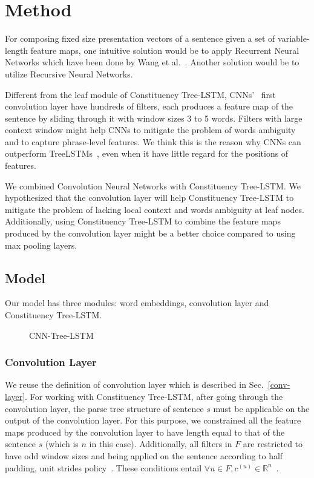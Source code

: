 \section{Method}\label{sec:cnn-treelstm}
For composing fixed size presentation vectors of a sentence given a set of variable-length feature maps, one intuitive solution would be to apply Recurrent Neural Networks which have been done by Wang et al.~\cite{cnn-rnn}.
Another solution would be to utilize Recursive Neural Networks.

Different from the leaf module of Constituency Tree-LSTM, CNNs'~\cite{KimCNN,DCNN,2-layer-cnn} first convolution layer have hundreds of filters, each produces a feature map of the sentence by sliding through it with window sizes 3 to 5 words.
Filters with large context window might help CNNs to mitigate the problem of words ambiguity and to capture phrase-level features.
We think this is the reason why CNNs can outperform TreeLSTMs~\cite{KimCNN}, even when it have little regard for the positions of features. 

We combined Convolution Neural Networks with Constituency Tree-LSTM.
We hypothesized that the convolution layer will help Constituency Tree-LSTM to mitigate the problem of lacking local context and words ambiguity at leaf nodes.
Additionally, using Constituency Tree-LSTM to combine the feature maps produced by the convolution layer might be a better choice compared to using max pooling layers.
\subsection{Model}
Our model has three modules: word embeddings, convolution layer and Constituency Tree-LSTM.
\begin{figure} [H]
	\centering
	
	\caption[qwerty]{CNN-Tree-LSTM}
\end{figure}
\subsubsection{Convolution Layer}
We reuse the definition of convolution layer which is described in Sec.~\ref{conv-layer}.
For working with Constituency Tree-LSTM, after going through the convolution layer, the parse tree structure of sentence \(s\) must be applicable on the output of the convolution layer. 
For this purpose, we constrained all the feature maps produced by the convolution layer to have length equal to that of the sentence \(s\) (which is \(n\) in this case).
Additionally, all filters in \(F\) are restricted to have odd window sizes and being applied on the sentence according to half padding, unit strides policy~\cite{conv-arith}.
These conditions entail \({\forall u \in F,  c^{(u)} \in \mathbb{R}^n}\)~\cite{conv-arith}.

